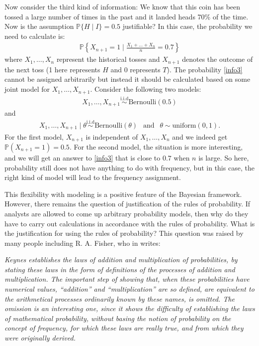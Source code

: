 \documentclass{scrartcl}
\renewcommand{\P}{{\mathbb P}}
\begin{document}
Now consider the third kind of information: We know that this coin has
been tossed a large number of times in the past and it landed heads
70\% of the time. Now is the assumption $\P\{H \mid I\} =
0.5$ justifiable? In this case, the probability we need to calculate
is:
\begin{align}\label{info3}
  \P \left\{X_{n+1} = 1 \mid \frac{X_1 + \dots + X_n}{n} = 0.7 \right\}
\end{align}
where $X_1, \dots, X_n$ represent the historical tosses and $X_{n+1}$
denotes the outcome of the next toss (1 here represents $H$ and 0
represents $T$). The probability \eqref{info3} cannot be assigned
arbitrarily but instead it should be calculated based on some joint
model for $X_1, \dots, X_{n+1}$. Consider the following two models:
\begin{align}\label{mod1}
  X_1, \dots, X_{n+1} \overset{\text{i.i.d}}{\sim} \text{Bernoulli}(0.5)
\end{align}
and
\begin{align}\label{mod1}
  X_1, \dots, X_{n+1} \mid \theta \overset{\text{i.i.d}}{\sim}
  \text{Bernoulli}(\theta) ~~ \text{ and } ~~ \theta \sim
  \text{uniform}(0, 1). 
\end{align}
For the first model, $X_{n+1}$ is independent of $X_1, \dots, X_n$ and
we indeed get $\P(X_{n+1} = 1) = 0.5$. For the second model, the
situation is more interesting, and we will get an answer to
\eqref{info3} that is close to $0.7$ when $n$ is large. So here,
probability still does not have anything to do with frequency, but in
this case, the right kind of model will lead to the frequency
assignment. 

This flexibility with modeling is a positive
feature of the Bayesian framework. However, there remains the question
of justification of the 
rules of probability. If analysts are allowed to come up arbitrary
probability models, then why do they have to carry out
calculations in accordance with the rules of probability. What is the
justification for using the rules of probability? This question was
raised by many people including R. A. Fisher, who in \cite{Fisher1934} writes:  

\textit{Keynes establishes the laws of addition and multiplication of
  probabilities, by stating these laws in the form of definitions of
  the processes of addition and multiplication. The important step of
  showing that, when these probabilities have numerical values,
  ``addition'' and ``multiplication'' are so defined, are equivalent
  to the arithmetical processes ordinarily known by these names, is
  omitted. The omission is an interesting one, since it shows the
  difficulty of establishing the laws of mathematical probability,
  without basing the notion of probability on the concept of
  frequency, for which these laws are really true, and from which they
  were originally derived.}
\end{document}
